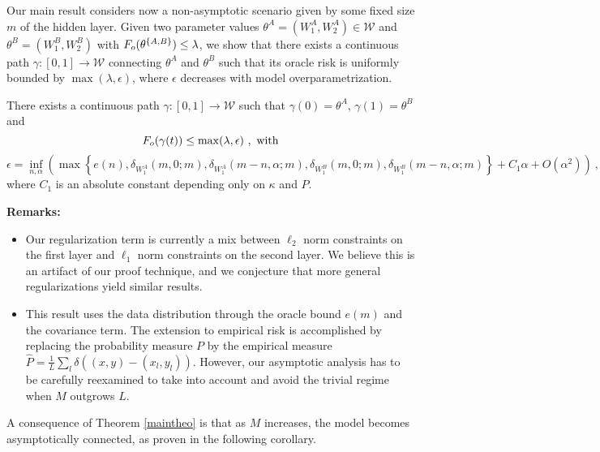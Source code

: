 Our main result considers now a non-asymptotic scenario given by some fixed
size $m$ of the hidden layer. Given two parameter values $\theta^A = (W_1^A, W_2^A) \in \mathcal{W}$ 
and $\theta^B= (W_1^B, W_2^B)$ with $F_{o}(\theta^{\{A,B\} } ) \leq \lambda$, 
we show that there exists a continuous path 
$\gamma: [0,1] \to \mathcal{W}$ connecting $\theta^A$ and $\theta^B$ 
such that its oracle risk is uniformly bounded by $\max(\lambda, \epsilon)$, where $\epsilon$ 
decreases with model overparametrization. 
\begin{theorem}
\label{maintheo}
There exists a continuous path $\gamma: [0,1] \to \mathcal{W}$ such that
$\gamma(0) = \theta^A$, $\gamma(1) = \theta^B$ and
\begin{equation}
F_{o}( \gamma(t) )  \leq \max( \lambda, \epsilon)~,\text{ with}
\end{equation}
\begin{equation}
\epsilon = \inf_{n, \alpha} \left(\max \left\{ e(n), \delta_{W_1^A}(m, 0; m ) , \delta_{W_1^A}(m-n, \alpha; m ) ,  \delta_{W_1^B}(m, 0; m ) , \delta_{W_1^B}(m-n, \alpha; m ) \right\} + C_1 \alpha  + O(\alpha^2) \right)~,
\end{equation}
where $C_1$ is an absolute constant depending only on $\kappa$ and $P$.
\end{theorem}
\textbf{Remarks:}
\begin{itemize}
\item Our regularization term is currently a mix between $\ell_2$ norm constraints on the first layer and $\ell_1$ norm constraints on the second layer. We believe this is an artifact of our proof technique, and we conjecture that more general regularizations yield similar results.
\item This result uses the data distribution through the oracle bound $e(m)$ and the covariance term. The 
extension to empirical risk is accomplished by replacing the probability measure $P$ by the empirical measure $\hat{P} = \frac{1}{L} \sum_l \delta\left( (x,y) - (x_l, y_l)\right) $. However, our asymptotic analysis has to be carefully reexamined to take into account and avoid the trivial regime when $M$ outgrows $L$.  
\end{itemize}
A consequence of Theorem \ref{maintheo} is that as $M$ increases, the model becomes asymptotically connected, as proven in the following corollary.
